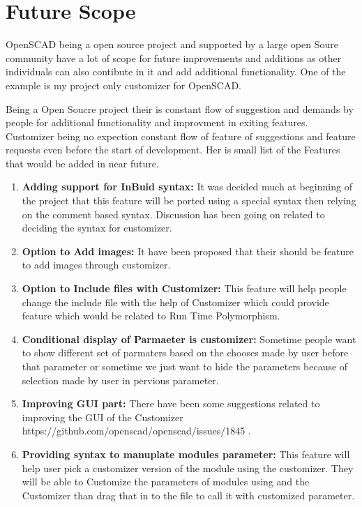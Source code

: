 \section{Future Scope}
OpenSCAD being a open source project and supported by a large open Soure community have a lot of scope for future improvements and additions as other individuals can also contibute in it and add additional functionality. One of the example is my project only customizer for OpenSCAD.

Being a Open Soucre project their is constant flow of suggestion and demands by people for additional functionality and improvment in exiting features.
Customizer being no expection constant flow of feature of suggestions and feature requests even before the start of development. Her is small list of the Features that would be added in near future.

\begin{enumerate}

\item \textbf{Adding support for InBuid syntax:} It was decided much at beginning of the project that this feature will be ported using a special syntax then relying on the comment based syntax. Discussion has been going on related to deciding the syntax for customizer.   

\item \textbf{Option to Add images:} It have been proposed that their should be feature to add images through customizer.  

\item \textbf{Option to Include files with Customizer:} This feature will help people change the include file with the help of Customizer which could provide feature which would be related to Run Time Polymorphism.

\item \textbf{Conditional display of Parmaeter is customizer:} Sometime people want to show different set of parmaters based on the chooses made by user before that parameter or sometime we just want to hide the parameters because of selection made by user in pervious parameter.

\item \textbf{Improving GUI part:} There have been some suggestions related to improving the GUI of the Customizer
https://github.com/openscad/openscad/issues/1845 . 
\item \textbf{Providing syntax to manuplate modules parameter:} This feature will help user pick a customizer version of the module using the customizer. They will be able to Customize the parameters of modules using and the Customizer than drag that in to the file to call it with customized parameter.
\end{enumerate} 

